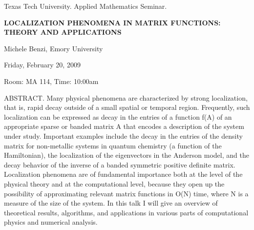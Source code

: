 \documentclass[oneside]{amsart}
\begin{document}
\begin{center}
Texas Tech University.  Applied Mathematics Seminar.

\end{center}

\begin{center}

{\LARGE \uppercase{\textbf{
Localization Phenomena in Matrix Functions: Theory and Applications
}}}

Michele Benzi, Emory University

Friday, February 20, 2009 

Room: MA 114, Time: 10:00am

\end{center}

ABSTRACT. Many physical phenomena are characterized by strong localization, that is, 
rapid decay outside of a small spatial or temporal region. Frequently, 
such localization can be expressed as decay in the entries of a function 
f(A) of an appropriate sparse or banded matrix A that encodes a description 
of the system under study. Important examples include the decay in the 
entries of the density matrix for non-metallic systems in quantum chemistry 
(a function of the Hamiltonian), the localization of the eigenvectors in the 
Anderson model, and the decay behavior of the inverse of a banded symmetric 
positive definite matrix. Localization phenomena are of fundamental importance 
both at the level of the physical theory and at the computational level, 
because they open up the possibility of approximating relevant matrix 
functions in O(N) time, where N is a measure of the size of the system. 
In this talk I will give an overview of theoretical results, algorithms, 
and applications in various parts of computational physics and numerical 
analysis.
\end{document}
